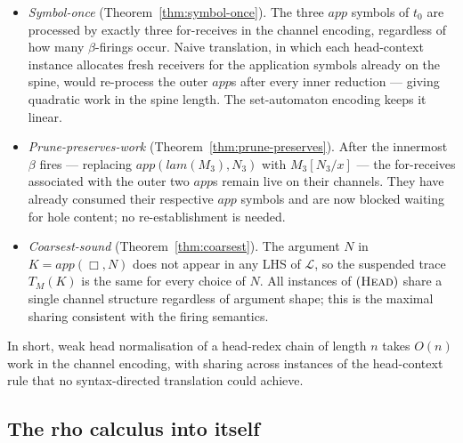 \documentclass[11pt]{article}
\theoremstyle{plain}
\theoremstyle{definition}
\theoremstyle{remark}
\newcommand{\Lhs}{\mathcal{L}}
\begin{document}
\begin{itemize}[leftmargin=*]
  \item \emph{Symbol-once} (Theorem~\ref{thm:symbol-once}). The three
        $\mathit{app}$ symbols of $t_{0}$ are processed by exactly
        three for-receives in the channel encoding, regardless of how
        many $\beta$-firings occur. Naive translation, in which each
        head-context instance allocates fresh receivers for the
        application symbols already on the spine, would re-process the
        outer $\mathit{app}$s after every inner reduction --- giving
        quadratic work in the spine length. The set-automaton encoding
        keeps it linear.
  \item \emph{Prune-preserves-work} (Theorem~\ref{thm:prune-preserves}).
        After the innermost $\beta$ fires --- replacing
        $\mathit{app}(\mathit{lam}(M_{3}), N_{3})$ with $M_{3}[N_{3}/x]$
        --- the for-receives associated with the outer two
        $\mathit{app}$s remain live on their channels. They have already
        consumed their respective $\mathit{app}$ symbols and are now
        blocked waiting for hole content; no re-establishment is
        needed.
  \item \emph{Coarsest-sound} (Theorem~\ref{thm:coarsest}). The argument
        $N$ in $K = \mathit{app}(\Box, N)$ does not appear in any LHS
        of $\Lhs$, so the suspended trace $T_{M}(K)$ is the same for
        every choice of $N$. All instances of $(\textsc{Head})$ share
        a single channel structure regardless of argument shape; this
        is the maximal sharing consistent with the firing semantics.
\end{itemize}

In short, weak head normalisation of a head-redex chain of length $n$
takes $O(n)$ work in the channel encoding, with sharing across instances
of the head-context rule that no syntax-directed translation could
achieve.

\subsection{The rho calculus into itself}\label{ssec:rho-into-rho}
\end{document}
